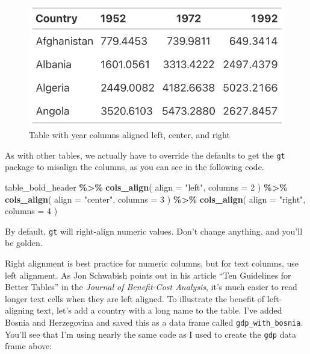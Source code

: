 \documentclass[
]{book}
\newenvironment{Shaded}{\begin{snugshade}}{\end{snugshade}}
\newcommand{\AttributeTok}[1]{\textcolor[rgb]{0.13,0.29,0.53}{#1}}
\newcommand{\DecValTok}[1]{\textcolor[rgb]{0.00,0.00,0.81}{#1}}
\newcommand{\FunctionTok}[1]{\textcolor[rgb]{0.13,0.29,0.53}{\textbf{#1}}}
\newcommand{\NormalTok}[1]{#1}
\newcommand{\SpecialCharTok}[1]{\textcolor[rgb]{0.81,0.36,0.00}{\textbf{#1}}}
\newcommand{\StringTok}[1]{\textcolor[rgb]{0.31,0.60,0.02}{#1}}
\begin{document}
\begin{figure}
\includegraphics[width=1\linewidth]{nostarch/temp/F05006} \caption{Table with year columns aligned left, center, and right}\label{fig:table-cols-aligned-lcr}
\end{figure}

As with other tables, we actually have to override the defaults to get the \texttt{gt} package to misalign the columns, as you can see in the following code.

\begin{Shaded}
\begin{Highlighting}[]
\NormalTok{table\_bold\_header }\SpecialCharTok{\%\textgreater{}\%}
  \FunctionTok{cols\_align}\NormalTok{(}
    \AttributeTok{align =} \StringTok{"left"}\NormalTok{,}
    \AttributeTok{columns =} \DecValTok{2}
\NormalTok{  ) }\SpecialCharTok{\%\textgreater{}\%}
  \FunctionTok{cols\_align}\NormalTok{(}
    \AttributeTok{align =} \StringTok{"center"}\NormalTok{,}
    \AttributeTok{columns =} \DecValTok{3}
\NormalTok{  ) }\SpecialCharTok{\%\textgreater{}\%}
  \FunctionTok{cols\_align}\NormalTok{(}
    \AttributeTok{align =} \StringTok{"right"}\NormalTok{,}
    \AttributeTok{columns =} \DecValTok{4}
\NormalTok{  )}
\end{Highlighting}
\end{Shaded}

By default, \texttt{gt} will right-align numeric values. Don't change anything, and you'll be golden.

Right alignment is best practice for numeric columns, but for text columns, use left alignment. As Jon Schwabish points out in his article ``Ten Guidelines for Better Tables'' in the \emph{Journal of Benefit-Cost Analysis}, it's much easier to read longer text cells when they are left aligned. To illustrate the benefit of left-aligning text, let's add a country with a long name to the table. I've added Bosnia and Herzegovina and saved this as a data frame called \texttt{gdp\_with\_bosnia}. You'll see that I'm using nearly the same code as I used to create the \texttt{gdp} data frame above:
\end{document}
